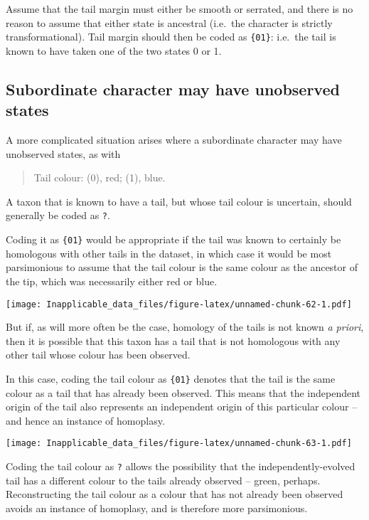 \documentclass[]{book}
\theoremstyle{definition}
\theoremstyle{definition}
\theoremstyle{definition}
\theoremstyle{remark}
\begin{document}
Assume that the tail margin must either be smooth or serrated, and there
is no reason to assume that either state is ancestral (i.e.~the
character is strictly transformational). Tail margin should then be
coded as \texttt{\{01\}}: i.e.~the tail is known to have taken one of
the two states 0 or 1.

\hypertarget{subordinate-character-may-have-unobserved-states}{%
\subsection{Subordinate character may have unobserved
states}\label{subordinate-character-may-have-unobserved-states}}

A more complicated situation arises where a subordinate character may
have unobserved states, as with

\begin{quote}
Tail colour: (0), red; (1), blue.
\end{quote}

A taxon that is known to have a tail, but whose tail colour is
uncertain, should generally be coded as \texttt{?}.

Coding it as \texttt{\{01\}} would be appropriate if the tail was known
to certainly be homologous with other tails in the dataset, in which
case it would be most parsimonious to assume that the tail colour is the
same colour as the ancestor of the tip, which was necessarily either red
or blue.

\texttt{[image: Inapplicable\_data\_files/figure-latex/unnamed-chunk-62-1.pdf]}

But if, as will more often be the case, homology of the tails is not
known \emph{a priori}, then it is possible that this taxon has a tail
that is not homologous with any other tail whose colour has been
observed.

In this case, coding the tail colour as \texttt{\{01\}} denotes that the
tail is the same colour as a tail that has already been observed. This
means that the independent origin of the tail also represents an
independent origin of this particular colour -- and hence an instance of
homoplasy.

\texttt{[image: Inapplicable\_data\_files/figure-latex/unnamed-chunk-63-1.pdf]}

Coding the tail colour as \texttt{?} allows the possibility that the
independently-evolved tail has a different colour to the tails already
observed -- green, perhaps. Reconstructing the tail colour as a colour
that has not already been observed avoids an instance of homoplasy, and
is therefore more parsimonious.
\end{document}
